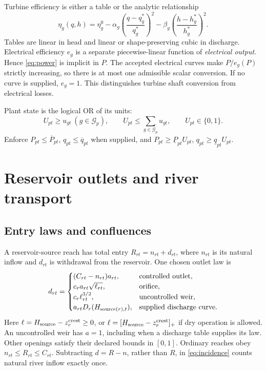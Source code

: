 \documentclass[10pt,a4paper]{article}
\newcommand{\pos}[1]{[#1]_+}
\begin{document}
Turbine efficiency is either a table or the analytic relationship
\begin{equation}
\eta_g(q,h)=\eta_g^0
-\alpha_g\left(\frac{q-q_g^*}{q_g^*}\right)^2
-\beta_g\left(\frac{h-h_g^*}{h_g^*}\right)^2.
\label{eq:analyticeta}
\end{equation}
Tables are linear in head and linear or shape-preserving cubic in discharge.
Electrical efficiency $e_g$ is a separate piecewise-linear function of
\emph{electrical output}. Hence \eqref{eq:power} is implicit in $P$.
The accepted electrical curves make $P/e_g(P)$ strictly increasing,
so there is at most one admissible scalar conversion. If no curve is supplied,
$e_g=1$. This distinguishes turbine shaft conversion from electrical losses.

Plant state is the logical OR of its units:
\begin{equation}
U_{pt}\ge u_{gt}\ (g\in\mathcal G_p),\qquad
U_{pt}\le\sum_{g\in\mathcal G_p}u_{gt},\qquad U_{pt}\in\{0,1\}.
\label{eq:plantstate}
\end{equation}
Enforce $P_{pt}\le\overline P_{pt}$,
$q_{pt}\le\overline q_{pt}$ when supplied, and
$P_{pt}\ge\underline P_{pt}U_{pt}$,
$q_{pt}\ge\underline q_{pt}U_{pt}$.

\section{Reservoir outlets and river transport}

\subsection{Entry laws and confluences}

A reservoir-source reach has total entry
$R_{rt}=n_{rt}+d_{rt}$, where $n_{rt}$ is its natural inflow and
$d_{rt}$ is withdrawal from the reservoir. One chosen outlet law is
\begin{equation}
d_{rt}=
\begin{cases}
(C_{rt}-n_{rt})a_{rt},&\text{controlled outlet},\\
c_ra_{rt}\sqrt{\ell_{rt}},&\text{orifice},\\
c_r\ell_{rt}^{3/2},&\text{uncontrolled weir},\\
a_{rt}D_r(H_{{\rm source}(r),t}),&\text{supplied discharge curve}.
\end{cases}
\label{eq:outlets}
\end{equation}
Here $\ell=H_{\rm source}-z_r^{\rm crest}\ge0$, or
$\ell=\pos{H_{\rm source}-z_r^{\rm crest}}$ if dry operation is allowed.
An uncontrolled weir has $a=1$, including when a discharge table supplies its
law. Other openings satisfy their declared bounds in $[0,1]$.
Ordinary reaches obey $n_{rt}\le R_{rt}\le C_{rt}$.
Subtracting $d=R-n$, rather than $R$, in \eqref{eq:incidence} counts natural
river inflow exactly once.
\end{document}
